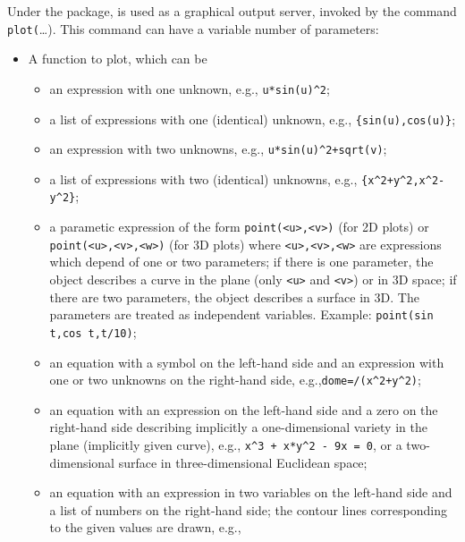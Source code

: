 Under the {\REDUCE}  package, {\Gnuplot} is used as a
graphical output server, invoked by the command
\texttt{plot(}\ldots{)}.  This command can have a variable number of
parameters:
\begin{itemize}
\item A function to plot, which can be
  \begin{itemize}
    \item an expression with one unknown, e.g.,
      \texttt{u*sin(u)\textasciicircum2};
    \item a list of expressions with one (identical) unknown,
      e.g., \texttt{\{sin(u),\allowbreak cos(u)\}};
    \item an expression with two unknowns, e.g.,
      \texttt{u*sin(u)\textasciicircum2+sqrt(v)};
    \item a list of expressions with two (identical) unknowns,
      e.g., \linebreak
      \texttt{\{x\textasciicircum{2}+y\textasciicircum{2},\allowbreak x\textasciicircum{2}-y\textasciicircum{2}\}};
    \item a parametic expression of the form \texttt{point(<u>,<v>)} (for 2D plots) or
      \texttt{point(<u>,\allowbreak <v>,<w>)} (for 3D plots) where \texttt{<u>,<v>,<w>} are
      expressions which depend of one or two parameters; if there is one
      parameter, the object describes a curve in the plane (only \texttt{<u>} and
      \texttt{<v>}) or in 3D space; if there are two parameters, the object
      describes a surface in 3D. The parameters are treated as independent
      variables.  Example: \texttt{point(sin t,cos t,t/10)};
    \item an equation with a symbol on the left-hand side and an
      expression with one or two unknowns on the right-hand side,
      e.g.,\linebreak[3] \texttt{dome=/(x\textasciicircum2+y\textasciicircum2)};
    \item an equation with an expression on the left-hand side and a
      zero on the right-hand side describing implicitly a
      one-dimensional variety in the plane (implicitly given curve),
      e.g., \texttt{x\textasciicircum3 + x*y\textasciicircum2 - 9x = 0},
      or a two-dimensional surface in three-dimensional Euclidean
      space;
    \item an equation with an expression in two variables on the left-hand side
      and a list of numbers on the right-hand side; the contour lines
      corresponding to the given values are drawn, e.g., \\

\end{itemize}
\end{itemize}

